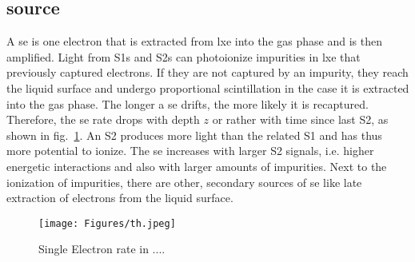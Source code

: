 
\FloatBarrier
\subsection{source}
\label{ssec:se-source}
\FloatBarrier


A \gls{se} is one electron that is extracted from \gls{lxe} into the gas phase and is then amplified.
Light from S1s and S2s can photoionize impurities in \gls{lxe} that previously captured electrons.
If they are not captured by an impurity, they reach the liquid surface and undergo proportional scintillation in the case it is extracted into the gas phase.
The longer a \gls{se} drifts, the more likely it is recaptured.
Therefore, the \gls{se} rate drops with depth $ z $ or rather with time since last S2, as shown in fig.~\ref{fig:se-rate}.  %
An S2 produces more light than the related S1 and has thus more potential to ionize.
The \gls{se} increases with larger S2 signals, i.e. higher energetic interactions and also with larger amounts of impurities\cite{}.  %
Next to the ionization of impurities, there are other, secondary sources of \gls{se} like late extraction of electrons from the liquid surface.


\begin{figure}
    \centering
    \texttt{[image: Figures/th.jpeg]}  %
    \caption[Single Electron Rate in 1T/100/LUX]{
        Single Electron rate in ...\cite{}.
    }
    \label{fig:se-rate}
\end{figure}




